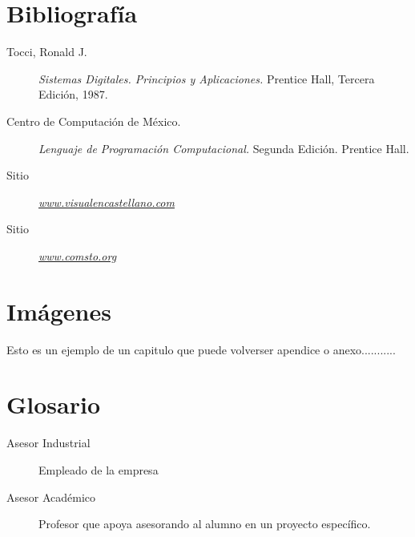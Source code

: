 \documentclass[12pt,spanish]{report}
\begin{document}
\newpage

\appendix
\chapter{Bibliograf\'ia}

\begin{description}
\item[Tocci, Ronald J.]{\emph{Sistemas Digitales. Principios y Aplicaciones.}} Prentice Hall, Tercera Edici\'on, 1987.
\item[Centro de Computaci\'on de M\'exico.] {\emph{Lenguaje de Programaci\'on Computacional.}} Segunda Edici\'on. Prentice Hall.
\item[Sitio] \underline{\emph{www.visualencastellano.com}}
\item[Sitio] \underline{\emph{www.comsto.org}}
\end{description}

\newpage

\chapter{Im\'agenes}

Esto es un ejemplo de un capitulo que puede volverser apendice o anexo...........

\newpage

\chapter{Glosario}

\begin{description}
\item[Asesor Industrial] Empleado de la empresa
\item[Asesor Acad\'emico] Profesor que apoya asesorando al alumno en un proyecto específico.
\end{description}

\newpage


\end{document}

